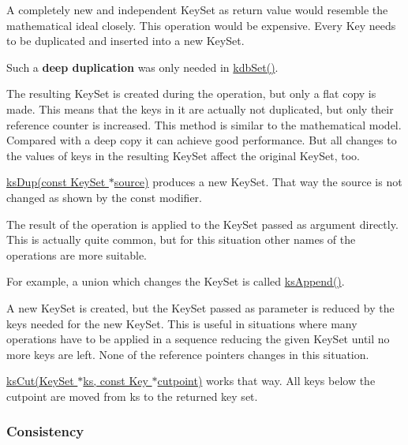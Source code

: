 \begin{DoxyItemize}
\item A completely new and independent {\ttfamily Key\+Set} as return value would resemble the mathematical ideal closely. This operation would be expensive. Every {\ttfamily Key} needs to be duplicated and inserted into a new {\ttfamily Key\+Set}.

Such a {\bfseries deep duplication} was only needed in {\ttfamily \hyperlink{group__kdb_ga11436b058408f83d303ca5e996832bcf}{kdb\+Set()}}.
\item The resulting {\ttfamily Key\+Set} is created during the operation, but only a flat copy is made. This means that the keys in it are actually not duplicated, but only their reference counter is increased. This method is similar to the mathematical model. Compared with a deep copy it can achieve good performance. But all changes to the values of keys in the resulting {\ttfamily Key\+Set} affect the original {\ttfamily Key\+Set}, too.

{\ttfamily \hyperlink{group__keyset_gac59e4b328245463f1451f68d5106151c}{ks\+Dup(const Key\+Set $\ast$source)}} produces a new {\ttfamily Key\+Set}. That way the {\ttfamily source} is not changed as shown by the {\ttfamily const} modifier.
\item The result of the operation is applied to the {\ttfamily Key\+Set} passed as argument directly. This is actually quite common, but for this situation other names of the operations are more suitable.

For example, a union which changes the {\ttfamily Key\+Set} is called {\ttfamily \hyperlink{group__keyset_ga21eb9c3a14a604ee3a8bdc779232e7b7}{ks\+Append()}}.
\item A new {\ttfamily Key\+Set} is created, but the {\ttfamily Key\+Set} passed as parameter is reduced by the keys needed for the new {\ttfamily Key\+Set}. This is useful in situations where many operations have to be applied in a sequence reducing the given {\ttfamily Key\+Set} until no more keys are left. None of the reference pointers changes in this situation.

{\ttfamily \hyperlink{group__keyset_ga6b00cf82b59af4d883a9bad6cf4a4a4a}{ks\+Cut(\+Key\+Set $\ast$ks, const Key $\ast$cutpoint)}} works that way. All keys below the {\ttfamily cutpoint} are moved from {\ttfamily ks} to the returned key set.
\end{DoxyItemize}

\subsubsection*{Consistency}

